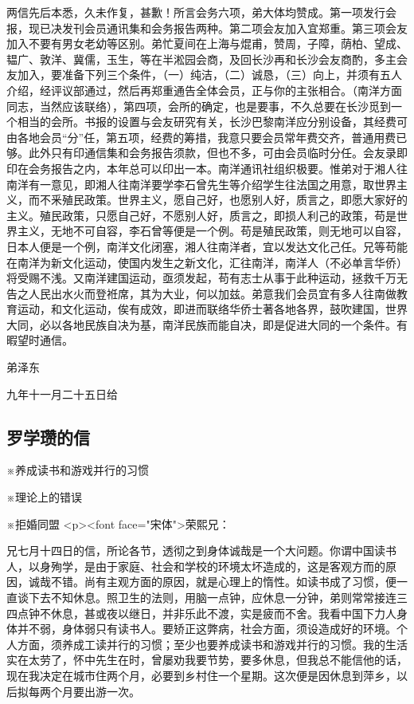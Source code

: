 两信先后本悉，久未作复，甚歉！所言会务六项，弟大体均赞成。第一项发行会报，现已决发刊会员通讯集和会务报告两种。第二项会友加入宜郑重。第三项会友加入不要有男女老幼等区别。弟忙夏间在上海与焜甫，赞周，子障，荫柏、望成、韫广、敦洋、冀儒，玉生，等在半淞园会商，及回长沙再和长沙会友商酌，多主会友加入，要准备下列三个条件，（一）纯洁，（二）诚恳，（三）向上，并须有五人介绍，经评议部通过，然后再郑重通告全体会员，正与你的主张相合。（南洋方面同志，当然应该联络），第四项，会所的确定，也是要事，不久总要在长沙觅到一个相当的会所。书报的设置与会友研究有关，长沙巴黎南洋应分别设备，其经费可由各地会员“分”任，第五项，经费的筹措，我意只要会员常年费交齐，普通用费已够。此外只有印通信集和会务报告须款，但也不多，可由会员临时分任。会友录即印在会务报告之内，本年总可以印出一本。南洋通讯社组织极要。惟弟对于湘人往南洋有一意见，即湘人往南洋要学李石曾先生等介绍学生往法国之用意，取世界主义，而不釆殖民政策。世界主义，愿自己好，也愿别人好，质言之，即愿大家好的主义。殖民政策，只愿自己好，不愿别人好，质言之，即损人利己的政策，苟是世界主义，无地不可自容，李石曾等便是一个例。苟是殖民政策，则无地可以自容，日本人便是一个例，南洋文化闭塞，湘人往南洋者，宜以发达文化己任。兄等苟能在南洋为新文化运动，使国内发生之新文化，汇往南洋，南洋人（不必单言华侨）将受赐不浅。又南洋建国运动，亟须发起，苟有志士从事于此种运动，拯救千万无告之人民出水火而登袵席，其为大业，何以加兹。弟意我们会员宜有多人往南做教育运动，和文化运动，俟有成效，即进而联络华侨士著各地各界，鼓吹建国，世界大同，必以各地民族自决为基，南洋民族而能自决，即是促进大同的一个条件。有暇望时通信。

 弟泽东

 九年十一月二十五日给
\subsection{罗学瓒的信}

※养成读书和游戏并行的习惯

※理论上的错误

※拒婚同盟
<p><font face="宋体">荣熙兄：

兄七月十四日的信，所论各节，透彻之到身体诚哉是一个大问题。你谓中国读书人，以身殉学，是由于家庭、社会和学校的环境太坏造成的，这是客观方而的原因，诚哉不错。尚有主观方面的原因，就是心理上的惰性。如读书成了习惯，便一直谈下去不知休息。照卫生的法则，用脑一点钟，应休息一分钟，弟则常常接连三四点钟不休息，甚或夜以继日，并非乐此不渡，实是疲而不舍。我看中国下力人身体并不弱，身体弱只有读书人。要矫正这弊病，社会方面，须设造成好的环境。个人方面，须养成工读并行的习惯；至少也要养成读书和游戏并行的习惯。我的生活实在太劳了，怀中先生在时，曾屡劝我要节势，要多休息，但我总不能信他的话，现在我决定在城市住两个月，必要到乡村住一个星期。这次便是因休息到萍乡，以后拟每两个月要出游一次。

